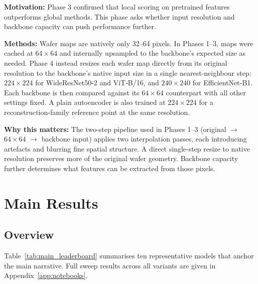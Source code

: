 \documentclass[11pt]{article}
\begin{document}
\textbf{Motivation:} Phase 3 confirmed that local scoring on pretrained features outperforms global methods. This phase
asks whether input resolution and backbone capacity can push performance further.

\textbf{Methods:} Wafer maps are natively only 32--64 pixels. In Phases 1--3, maps were cached at $64\!\times\!64$ and
internally upsampled to the backbone's expected size as needed. Phase 4 instead resizes each wafer map directly
from its original resolution to the backbone's native input size in a single nearest-neighbour step: $224\!\times\!224$
for WideResNet50-2 and ViT-B/16, and $240\!\times\!240$ for EfficientNet-B1. Each backbone is then compared against
its $64\!\times\!64$ counterpart with all other settings fixed. A plain autoencoder is also trained at $224\!\times\!224$
for a reconstruction-family reference point at the same resolution.

\textbf{Why this matters:} The two-step pipeline used in Phases 1--3 (original $\to$ $64\!\times\!64$ $\to$ backbone input)
applies two interpolation passes, each introducing artefacts and blurring fine spatial structure. A direct single-step
resize to native resolution preserves more of the original wafer geometry. Backbone capacity further determines what
features can be extracted from those pixels.

\section{Main Results}

\subsection{Overview}

Table~\ref{tab:main_leaderboard} summarises ten representative models
that anchor the main narrative. Full sweep results across all variants are given in
Appendix~\ref{app:notebooks}.
\end{document}
